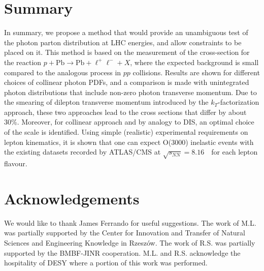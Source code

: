 \section{Summary}

In summary, we propose a method that would provide an unambiguous test of the photon parton distribution at LHC energies, and allow 
constraints to be placed on it.
This method is based on the measurement of the cross-section for the reaction $p+\textrm{Pb}\rightarrow \textrm{Pb} + \ell^+\ell^- + X$, where the expected background is small compared to the analogous process in $pp$ collisions. 
Results are shown for different choices of collinear photon PDFs, and a comparison is made with unintegrated photon distributions that include non-zero photon transverse momentum.
Due to the smearing of dilepton transverse momentum introduced by the $k_T$-factorization approach, these two approaches lead to the cross sections that differ by about 30\%.
Moreover, for collinear approach and  by analogy to DIS, an optimal choice of the scale is identified.
Using simple (realistic) experimental requirements on lepton kinematics, it is shown that one can expect O(3000) inelastic events with the existing datasets recorded by ATLAS/CMS at $\sqrt{s_{N N}} = 8.16$~\TeV\ for each lepton flavour.


\section*{Acknowledgements}
We would like to thank James Ferrando for useful suggestions.
The work of M.L. was partially supported by the Center for Innovation and
Transfer of Natural Sciences and Engineering Knowledge in Rzesz{\'o}w.
The work of R.S. was partially supported by the BMBF-JINR cooperation.
M.L. and R.S. acknowledge the hospitality of DESY where a portion of
this work was performed.
